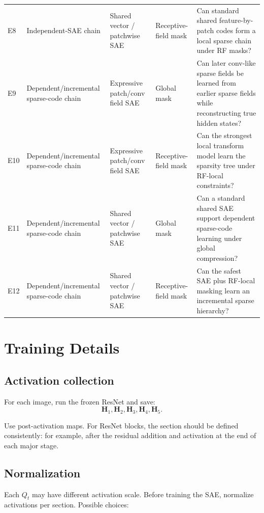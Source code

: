 \documentclass[11pt]{article}
\newcommand{\Htens}{\mathbf{H}}
\begin{document}
\begin{longtable}{p{}p{}p{}p{}p{}}
E8 & Independent-SAE chain & Shared vector / patchwise SAE & Receptive-field mask & Can standard shared feature-by-patch codes form a local sparse chain under RF masks?\\
\addlinespace

E9 & Dependent/incremental sparse-code chain & Expressive patch/conv field SAE & Global mask & Can later conv-like sparse fields be learned from earlier sparse fields while reconstructing true hidden states?\\
\addlinespace

E10 & Dependent/incremental sparse-code chain & Expressive patch/conv field SAE & Receptive-field mask & Can the strongest local transform model learn the sparsity tree under RF-local constraints?\\
\addlinespace

E11 & Dependent/incremental sparse-code chain & Shared vector / patchwise SAE & Global mask & Can a standard shared SAE support dependent sparse-code learning under global compression?\\
\addlinespace

E12 & Dependent/incremental sparse-code chain & Shared vector / patchwise SAE & Receptive-field mask & Can the safest SAE plus RF-local masking learn an incremental sparse hierarchy?\\

\bottomrule
\end{longtable}

\section{Training Details}

\subsection{Activation collection}

For each image, run the frozen ResNet and save:
\[
\Htens_1,\Htens_2,\Htens_3,\Htens_4,\Htens_5.
\]

Use post-activation maps. For ResNet blocks, the section should be defined consistently: for example, after the residual addition and activation at the end of each major stage.

\subsection{Normalization}

Each \(Q_t\) may have different activation scale. Before training the SAE, normalize activations per section. Possible choices:
\end{document}
